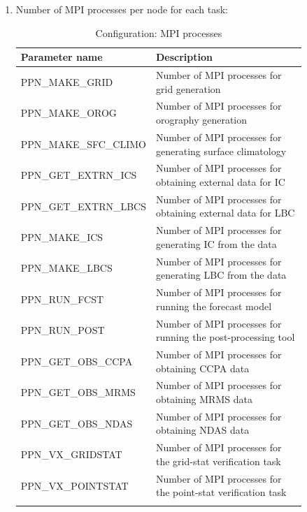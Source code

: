 \documentclass[11pt,fleqn]{report}              %
\begin{document}
\begin{enumerate}
\item Number of MPI processes per node for each task:
{
\scriptsize
\begin{longtable}{ p{0.25\linewidth} | p{0.6\linewidth} }
\hline
\hline
Parameter name & Description \\
\hline
PPN\_MAKE\_GRID  & Number of MPI processes for grid generation \\
PPN\_MAKE\_OROG  & Number of MPI processes for orography generation \\
PPN\_MAKE\_SFC\_CLIMO  & Number of MPI processes for generating surface climatology \\
PPN\_GET\_EXTRN\_ICS  & Number of MPI processes for obtaining external data for IC \\
PPN\_GET\_EXTRN\_LBCS  & Number of MPI processes for obtaining external data for LBC \\
PPN\_MAKE\_ICS  & Number of MPI processes for generating IC from the data \\
PPN\_MAKE\_LBCS  & Number of MPI processes for generating LBC from the data\\
PPN\_RUN\_FCST  & Number of MPI processes for running the forecast model \\
PPN\_RUN\_POST  & Number of MPI processes for running the post-processing tool \\
PPN\_GET\_OBS\_CCPA & Number of MPI processes for obtaining CCPA data  \\
PPN\_GET\_OBS\_MRMS & Number of MPI processes for obtaining MRMS data  \\
PPN\_GET\_OBS\_NDAS & Number of MPI processes for obtaining NDAS data \\
PPN\_VX\_GRIDSTAT & Number of MPI processes for the grid-stat verification task \\
PPN\_VX\_POINTSTAT & Number of MPI processes for the point-stat verification task \\
\hline
\caption{Configuration: MPI processes}
\label{table:config_MPI}
\end{longtable}
}


\end{enumerate}
\end{document}
